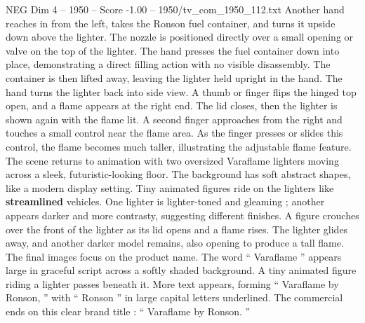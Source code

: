 \begin{textsample}{NEG Dim 4 – 1950 – Score -1.00 – 1950/tv\_com\_1950\_112.txt}
Another hand reaches in from the left, takes the Ronson fuel container, and turns it upside down above the lighter.
The nozzle is positioned directly over a small opening or valve on the top of the lighter.
The hand presses the fuel container down into place, demonstrating a direct filling action with no visible disassembly.
The container is then lifted away, leaving the lighter held upright in the hand.
The hand turns the lighter back into side view.
A thumb or finger flips the hinged top open, and a flame appears at the right end.
The lid closes, then the lighter is shown again with the flame lit.
A second finger approaches from the right and touches a small control near the flame area.
As the finger presses or slides this control, the flame becomes much taller, illustrating the adjustable flame feature.
The scene returns to animation with two oversized Varaflame lighters moving across a sleek, futuristic-looking floor.
The background has soft abstract shapes, like a modern display setting.
Tiny animated figures ride on the lighters like \textbf{streamlined} vehicles.
One lighter is lighter-toned and gleaming ; another appears darker and more contrasty, suggesting different finishes.
A figure crouches over the front of the lighter as its lid opens and a flame rises.
The lighter glides away, and another darker model remains, also opening to produce a tall flame.
The final images focus on the product name.
The word “ Varaflame ” appears large in graceful script across a softly shaded background.
A tiny animated figure riding a lighter passes beneath it.
More text appears, forming “ Varaflame by Ronson, ” with “ Ronson ” in large capital letters underlined.
The commercial ends on this clear brand title : “ Varaflame by Ronson. ”

\end{textsample}
